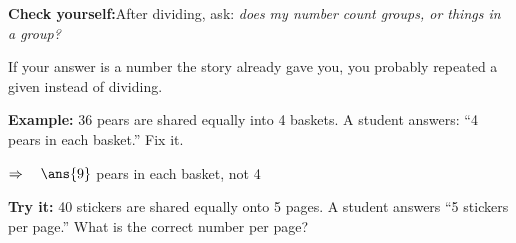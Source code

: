 \documentclass[12pt]{article}
\begin{document}

\begin{formulabox}
\textbf{Check yourself:}\quad After dividing, ask: \emph{does my number count groups, or things in a group?}\par
If your answer is a number the story already gave you, you probably repeated a given instead of dividing.
\end{formulabox}

\begin{examplebox}
\textbf{Example:} 36 pears are shared equally into 4 baskets. A student answers: ``4 pears in each basket.'' Fix it.

$\Rightarrow\quad\ans{9}$ pears in each basket, not 4
\end{examplebox}

\begin{tryitbox}
\textbf{Try it:} 40 stickers are shared equally onto 5 pages. A student answers ``5 stickers per page.'' What is the correct number per page?\\[2pt]
\end{tryitbox}
\end{document}
